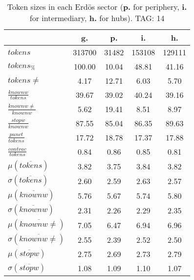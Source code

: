 \begin{table}[h!]
\begin{center}
\begin{tabular}{| l || c | c | c | c |}\hline
 & {\bf g.} & {\bf p.} & {\bf i.} & {\bf h.} \\\hline\hline
$tokens$ & 313700  & 31482  & 153108  & 129111 \\
$tokens_{\%}$ & 100.00  & 10.04  & 48.81  & 41.16 \\
$tokens \neq$ & 4.17  & 12.71  & 6.03  & 5.70 \\\hline
$\frac{knownw}{tokens}$ & 39.67  & 39.02  & 40.24  & 39.16 \\
$\frac{knownw \neq}{knownw}$ & 5.62  & 19.41  & 8.51  & 8.97 \\\hline
$\frac{stopw}{knownw}$ & 87.55  & 85.04  & 86.35  & 89.63 \\
$\frac{punct}{tokens}$ & 17.72  & 18.78  & 17.37  & 17.88 \\
$\frac{contrac}{tokens}$ & 0.84  & 0.86  & 0.85  & 0.81 \\\hline\hline
$\mu(\overline{tokens})$ & 3.82  & 3.75  & 3.84  & 3.82 \\
$\sigma(\overline{tokens})$ & 2.60  & 2.59  & 2.63  & 2.57 \\\hline
$\mu(\overline{knownw})$ & 5.76  & 5.67  & 5.74  & 5.80 \\
$\sigma(\overline{knownw})$ & 2.31  & 2.26  & 2.29  & 2.35 \\\hline
$\mu(\overline{knownw \neq})$ & 7.05  & 6.47  & 6.94  & 6.96 \\
$\sigma(\overline{knownw \neq})$ & 2.55  & 2.39  & 2.52  & 2.50 \\\hline
$\mu(\overline{stopw})$ & 2.75  & 2.69  & 2.73  & 2.79 \\
$\sigma(\overline{stopw})$ & 1.08  & 1.09  & 1.10  & 1.07 \\\hline
\end{tabular}
\caption{Token sizes in each Erd\"os sector ({{\bf p.}} for periphery, {{\bf i.}} for intermediary, {{\bf h.}} for hubs). TAG: 14}
\end{center}
\end{table}